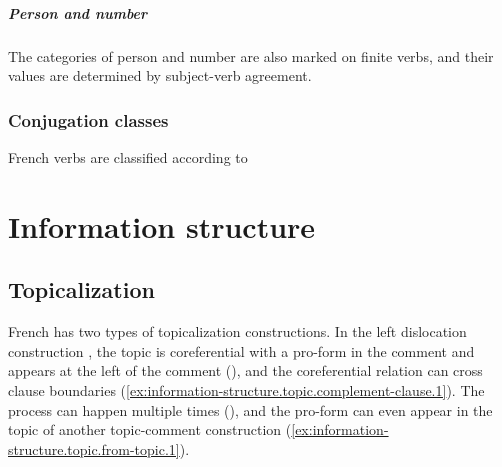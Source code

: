 \documentclass[a4paper, oneside, 12pt]{report}
\newcommand*{\citepages}[1]{pp.~{#1}}
\begin{document}
\paragraph*{Person and number}
The categories of person and number are also marked on finite verbs,
and their values are determined by subject-verb agreement. 

\subsection{Conjugation classes}

French verbs are classified according to 

\chapter{Information structure}

\section{Topicalization}\label{sec:information-structure.topic}

French has two types of topicalization constructions.
In the left dislocation construction \citep[\citepages{174-175}]{rowlett2007syntax},
the topic is coreferential with a pro-form in the comment
and appears at the left of the comment
(),
and the coreferential relation can cross clause boundaries
(\ref{ex:information-structure.topic.complement-clause.1}).
The process can happen multiple times
(),
and the pro-form can even appear in the topic of another topic-comment construction
(\ref{ex:information-structure.topic.from-topic.1}).
\end{document}
